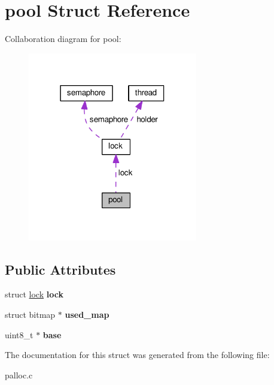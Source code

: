 \hypertarget{structpool}{}\section{pool Struct Reference}
\label{structpool}


Collaboration diagram for pool\+:
\nopagebreak
\begin{figure}[H]
\begin{center}
\leavevmode
\includegraphics[width=210pt]{structpool__coll__graph}
\end{center}
\end{figure}
\subsection*{Public Attributes}
\begin{DoxyCompactItemize}
\item 
struct \hyperlink{structlock}{lock} {\bfseries lock}\hypertarget{structpool_ae9331ff5a685b586cd3693b68daf5b4f}{}\label{structpool_ae9331ff5a685b586cd3693b68daf5b4f}

\item 
struct bitmap $\ast$ {\bfseries used\+\_\+map}\hypertarget{structpool_a2466db5ef7583841658d26d5ccfab9a1}{}\label{structpool_a2466db5ef7583841658d26d5ccfab9a1}

\item 
uint8\+\_\+t $\ast$ {\bfseries base}\hypertarget{structpool_aab1398419a45bb23a0e617a50e7dc1fb}{}\label{structpool_aab1398419a45bb23a0e617a50e7dc1fb}

\end{DoxyCompactItemize}


The documentation for this struct was generated from the following file\+:\begin{DoxyCompactItemize}
\item 
palloc.\+c\end{DoxyCompactItemize}
